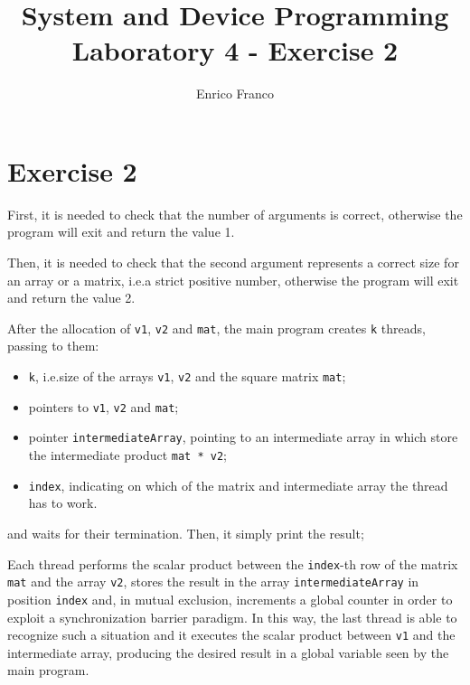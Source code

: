 \documentclass{report}
\author{Enrico Franco}
\title{System and Device Programming \\
	Laboratory 4 - Exercise 2}
\begin{document}
\section*{Exercise 2}
First, it is needed to check that the number of arguments is correct, otherwise the program will exit and return the value 1.

Then, it is needed to check that the second argument represents a correct size for an array or a matrix, i.e.\@ a strict positive number, otherwise the program will exit and return the value 2.

After the allocation of \texttt{v1}, \texttt{v2} and \texttt{mat}, the main program creates \texttt{k} threads, passing to them:
\begin{itemize}
\item \texttt{k}, i.e.\@ size of the arrays \texttt{v1}, \texttt{v2} and the square matrix \texttt{mat};
\item pointers to \texttt{v1}, \texttt{v2} and \texttt{mat};
\item pointer \texttt{intermediateArray}, pointing to an intermediate array in which store the intermediate product \texttt{mat * v2};
\item \texttt{index}, indicating on which of the matrix and intermediate array the thread has to work.
\end{itemize}
and waits for their termination. Then, it simply print the result;

Each thread performs the scalar product between the \texttt{index}-th row of the matrix \texttt{mat} and the array \texttt{v2}, stores the result in the array \texttt{intermediateArray} in position \texttt{index} and, in mutual exclusion, increments a global counter in order to exploit a synchronization barrier paradigm. In this way, the last thread is able to recognize such a situation and it executes the scalar product between \texttt{v1} and the intermediate array, producing the desired result in a global variable seen by the main program.
\end{document}

